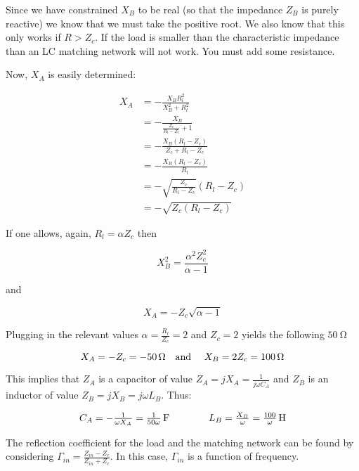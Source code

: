 Since we have constrained $X_B$ to be real (so that the impedance $Z_B$ is purely
reactive) we know that we must take the positive root. We also know that this
only works if $R > Z_c$. If the load is smaller than the characteristic
impedance than an LC matching network will not work. You must add some
resistance.

Now, $X_A$ is easily determined:

\begin{align*}
    X_A &= -\frac{X_B R_l^2}{X_B^2 + R_l^2} \\
        &= - \frac{X_B}{\frac{Z_c}{R_l - Z_c} + 1} \\
        &= -\frac{X_B \left( R_l - Z_c \right)}{Z_c + R_l - Z_c} \\
        &= -\frac{X_B \left( R_l - Z_c \right)}{R_l} \\
        &= -\sqrt{\frac{Z_c}{R_l - Z_c}} \left( R_l - Z_c \right) \\
        &= -\sqrt{Z_c \left( R_l-Z_c \right)}
\end{align*}

If one allows, again, $R_l = \alpha Z_c$ then

\[ 
    X_B^2 = \frac{\alpha^2 Z_c^2}{\alpha - 1} 
\]

and 

\[ 
        X_A = -Z_c\sqrt{\alpha - 1}
\]


Plugging in the relevant values $\alpha = \frac{R_l}{Z_c} = 2$ and $Z_c = 2$
yields the following $\SI{50}{\ohm}$

\[ 
        X_A = - Z_c = -\SI{50}{\ohm} \text{\quad and \quad} X_B = 2 Z_c = \SI{100}{\ohm}
\]

This implies that $Z_A$ is a capacitor of value $Z_A = j X_A = \frac{1}{j\omega
C_A}$ and $Z_B$ is an inductor of value $Z_B = j X_B = j \omega L_B$. Thus:

\[
\arraycolsep=20pt
\begin{array}{cc}
    C_A = -\frac{1}{\omega X_A} = 
        \SI[parse-numbers = false]{\frac{1}{50\omega}}{\farad} & 
    L_B = \frac{X_B}{\omega} = 
        \SI[parse-numbers = false]{\frac{100}{\omega}}{\henry}
\end{array}
\]

The reflection coefficient for the load and the matching network can be found by
considering $ \Gamma_{in} = \frac{Z_{in} - Z_c}{Z_{in} + Z_c} $. In this case,
$\Gamma_{in}$ is a function of frequency.


